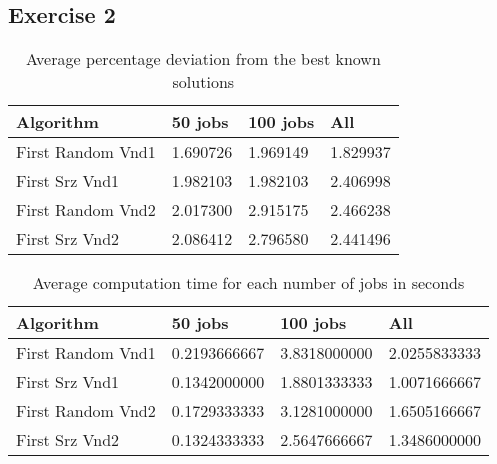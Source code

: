 \documentclass[]{article}
\begin{document}
	
	
	\subsection{Exercise 2}
	
	
	
	\begin{table}[H]
		\centering
		\caption{Average percentage deviation from the best known solutions}
		\label{tab:table1}
		\begin{tabular}{l{|}lll}
			\toprule
			Algorithm & 50 jobs & 100 jobs & All\\
			\midrule
			First Random Vnd1 &1.690726&1.969149  &1.829937 \\ 
			First Srz Vnd1 &1.982103 &1.982103&2.406998\\ 
			First Random Vnd2 &2.017300&2.915175  &2.466238\\ 
			First Srz Vnd2 & 2.086412&2.796580   &2.441496\\ 
			
			
			
			\bottomrule
		\end{tabular}
	\end{table}
	
	\begin{table}[H]
		\centering
		\caption{Average computation time for each number of jobs in seconds}
		\label{tab:table1}
		\begin{tabular}{l{|}lll}
			\toprule
			Algorithm & 50 jobs & 100 jobs & All\\
			\midrule
			First Random Vnd1 & 0.2193666667 & 3.8318000000 & 2.0255833333 \\ 
			First Srz Vnd1 & 0.1342000000 & 1.8801333333 & 1.0071666667 \\ 
			First Random Vnd2 & 0.1729333333 & 3.1281000000 & 1.6505166667 \\ 
			First Srz Vnd2 & 0.1324333333 & 2.5647666667 & 1.3486000000 \\ 
			
			\bottomrule
		\end{tabular}
	\end{table}
	
\end{document}
